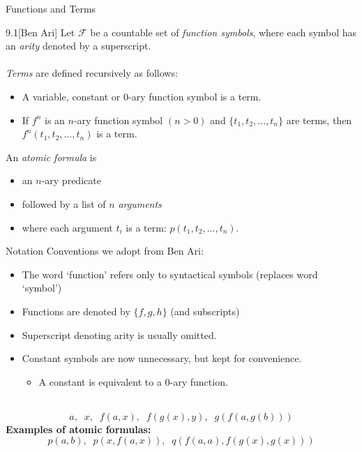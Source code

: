 \documentclass[style=sailor,size=12pt]{powerdot}
\begin{document}
\begin{wideslide}[bm=,toc=]{Functions and Terms}
\begin{defn}{9.1}[Ben Ari]
Let $\mathcal{F}$ be a countable set of \emph{function symbols}, where
each symbol has an \emph{arity} denoted by a superscript. 
\\~\\
\pause
\emph{Terms} are defined recursively as follows:
\end{defn}
\vspace{-2ex}
\begin{itemize}
\item<3-> A variable, constant or $0$-ary function symbol is a term.
\item<4-> If $f^n$ is an $n$-ary function symbol $(n > 0)$ and $\{t_1,t_2,...,t_n\}$
are terms, then $f^n(t_1,t_2,...,t_n)$ is a term.
\end{itemize}
\pause[3]
An \emph{atomic formula} is 
\begin{itemize}
\item<6-> an $n$-ary predicate 
\item<7-> followed by a list of $n$ \emph{arguments} 
\item<8-> where each argument $t_i$ is a term: $p(t_1,t_2,...,t_n)$.
\end{itemize}
\end{wideslide}

\begin{wideslide}[bm=,toc=]{Notation}
Conventions we adopt from Ben Ari:
\begin{itemize}
\item<2-> The word `function' refers only to syntactical symbols (replaces word `symbol') 
\item<3-> Functions are denoted by $\{f,g,h\}$ (and subscripts)
\item<4-> Superscript denoting arity is usually omitted.
\item<5-> Constant symbols are now unnecessary, but kept for convenience.
\begin{itemize}
\item<6-> A constant is equivalent to a $0$-ary function.
\end{itemize}
\end{itemize}
~\\
\[
  a,\;\; x,\;\; f(a,x),\;\; f(g(x),y),\;\; g(f(a,g(b)))
  \]
\pause
{\bf Examples of atomic formulas:}
\[
  p(a,b),\;\; p(x,f(a,x)),\;\; q(f(a,a), f(g(x),g(x)))
\]
\end{wideslide}
\end{document}
